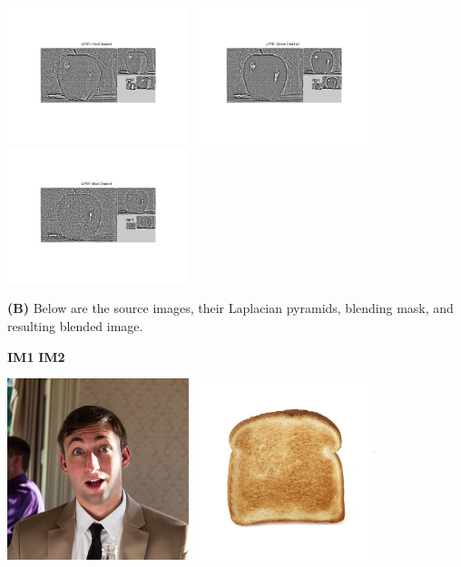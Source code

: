 \documentclass[12pt,twoside]{article}
\newcommand{\tabUnit}{3ex}
\newcommand{\tabT}{\hspace*{\tabUnit}}
\begin{document}
\includegraphics[width = 150pt, trim = 100pt 100pt 100pt 100pt, clip]{appleLR}
\includegraphics[width = 150pt, trim = 100pt 100pt 100pt 100pt, clip]{appleLG}
\includegraphics[width = 150pt, trim = 100pt 100pt 100pt 100pt, clip]{appleLB}
\newline

\tabT \textbf{(B)} Below are the source images, their Laplacian pyramids, blending mask, and resulting blended image.
\newline

\tabT\tabT\tabT\tabT\tabT\tabT\tabT\tabT\tabT \textbf{IM1}
\tabT\tabT\tabT\tabT\tabT\tabT\tabT \textbf{IM2}
\newline

\tabT\tabT\tabT\tabT\tabT
\includegraphics[width = 150pt]{andremo_pic}
\includegraphics[width = 150pt]{toast}
\newline
\end{document}
